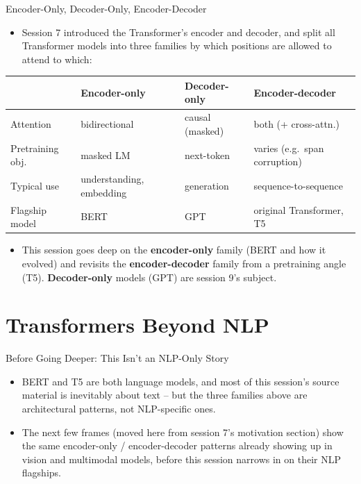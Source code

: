 \begin{vbframe}{Encoder-Only, Decoder-Only, Encoder-Decoder}
\begin{itemize}
  \item Session 7 introduced the Transformer's encoder and decoder, and split all Transformer models into three families by which positions are allowed to attend to which:
\end{itemize}
\begin{center}
\footnotesize
\begin{tabular}{@{}p{2.1cm}p{2.8cm}p{2.6cm}p{3.2cm}@{}}
\toprule
 & \textbf{Encoder-only} & \textbf{Decoder-only} & \textbf{Encoder-decoder} \\
\midrule
Attention & bidirectional & causal (masked) & both (+ cross-attn.) \\[2pt]
Pretraining obj. & masked LM & next-token & varies (e.g.\ span corruption) \\[2pt]
Typical use & understanding, embedding & generation & sequence-to-sequence \\[2pt]
Flagship model & BERT & GPT & original Transformer, T5 \\
\bottomrule
\end{tabular}
\end{center}
\begin{itemize}
  \item This session goes deep on the \textbf{encoder-only} family (BERT and how it evolved) and revisits the \textbf{encoder-decoder} family from a pretraining angle (T5). \textbf{Decoder-only} models (GPT) are session 9's subject.
\end{itemize}
\end{vbframe}


\section{Transformers Beyond NLP}

\begin{vbframe}{Before Going Deeper: This Isn't an NLP-Only Story}
\begin{itemize}
  \item BERT and T5 are both language models, and most of this session's source material is inevitably about text -- but the three families above are architectural patterns, not NLP-specific ones.
  \item The next few frames (moved here from session 7's motivation section) show the same encoder-only / encoder-decoder patterns already showing up in vision and multimodal models, before this session narrows in on their NLP flagships.
\end{itemize}
\end{vbframe}

